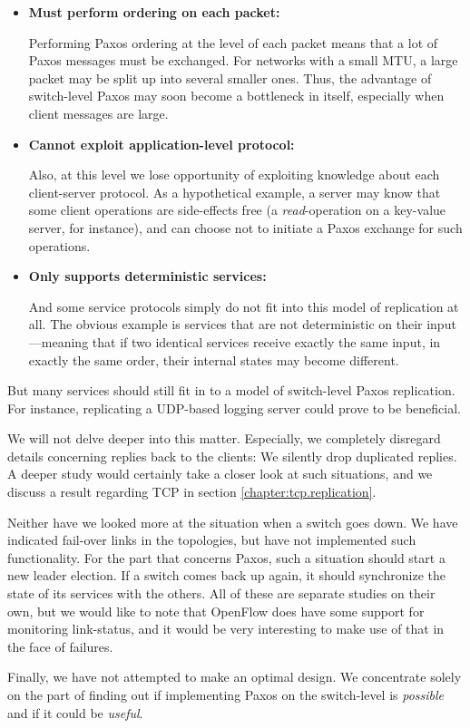 \begin{itemize}
  \item \textbf{Must perform ordering on each packet:}

Performing Paxos ordering at the level of each packet means that a lot of
Paxos messages must be exchanged.  For networks with a small \ac{MTU}, a
large packet may be split up into several smaller ones.  Thus, the advantage
of switch-level Paxos may soon become a bottleneck in itself, especially
when client messages are large.

  \item \textbf{Cannot exploit application-level protocol:}

Also, at this level we lose opportunity of exploiting knowledge about
each client-server protocol.  As a hypothetical example, a server may know
that some client operations are side-effects free (a
\textit{read}-operation on a key-value server, for instance), and can
choose not to initiate a Paxos exchange for such operations.

  \item \textbf{Only supports deterministic services:}

And some service protocols simply do not fit into this model
of replication at all.  The obvious example is services that are not
deterministic on their input---meaning that if two identical services 
receive exactly the same input, in exactly the same order, their internal
states may become different.

\end{itemize}

But many services should still fit in to a model of switch-level
Paxos replication.  For instance, replicating a \acs{UDP}-based logging
server could prove to be beneficial.

We will not delve deeper into this matter.  Especially, we completely
disregard details concerning replies back to the clients: We silently
drop duplicated replies.  A deeper study would certainly take a closer
look at such situations, and we discuss a result regarding TCP in section
\ref{chapter:tcp.replication}.

Neither have we looked more at the situation when a switch goes down.
We have indicated fail-over links in the topologies, but have not
implemented such functionality.  For the part that concerns Paxos, such a
situation should start a new leader election.  If a switch comes back up
again, it should synchronize the state of its services with the others.
All of these are separate studies on their own, but we would like to note
that OpenFlow does have some support for monitoring link-status, and it
would be very interesting to make use of that in the face of failures.

Finally, we have not attempted to make an optimal design.  We concentrate
solely on the part of finding out if implementing Paxos on the switch-level
is \textit{possible} and if it could be \textit{useful}.

